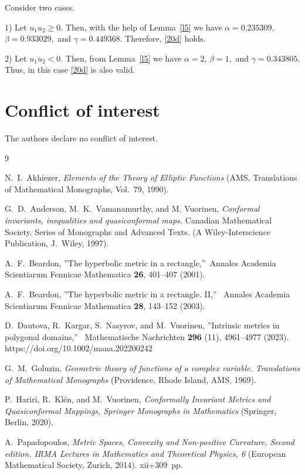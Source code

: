 \documentclass[12pt,a4paper]{amsart}
\begin{document}
Consider two cases.

1) Let
$u_1u_2\ge 0$. Then, with the help of Lemma~\ref{l5} we have $\alpha=0.235309$, $\beta=0.933029,$ and $\gamma=0.449368$. Therefore, \eqref{20d} holds.

2) Let
$u_1u_2<0$. Then, from Lemma~\ref{l5} we have $\alpha=2$, $\beta=1,$ and $\gamma=0.343805$. Thus, in this case \eqref{20d} is also valid.

\section*{Conflict of interest}
The authors declare no conflict of interest.


\begin{thebibliography}{9}

N.~I.~Akhiezer, \emph{Elements of the Theory of Elliptic Functions}
(AMS, Translations of Mathematical Monographs, Vol.~79,
1990).


G.~D.~Anderson, M.~K.~Vamanamurthy, and
M. Vuorinen,  \emph{Conformal invariants, inequalities and
quasiconformal maps.}   Canadian Mathematical Society. Series of Monographs and Advanced Texts. (A Wiley-Interscience Publication, J.~Wiley, 1997).

A.~F.~Beardon, ''The hyperbolic metric in a rectangle,''\  Annales
Academia Scientiarum Fennicae Mathematica \textbf{26}, 401--407 (2001).

A.~F.~Beardon, ''The hyperbolic metric in a rectangle. II,'' \ Annales
Academia Scientiarum Fennicae Mathematica  \textbf{28}, 143--152 (2003).

 D.~Dautova, R.~Kargar, S.~Nasyrov, and M.~Vuorinen, ''Intrinsic metrics in polygonal domains,'' \ Mathematische Nachrichten \textbf{296} (11), 4961--4977 (2023).
https://doi.org/10.1002/mana.202200242

G.~M.~Goluzin, \emph{Geometric theory of functions of a complex variable. Translations of Mathematical Monographs} (Providence, Rhode Island, AMS, 1969).

P.~Hariri, R.~Kl\'en, and M.~Vuorinen, \emph{Conformally Invariant Metrics and Quasiconformal Mappings, Springer Monographs
in Mathematics} (Springer, Berlin, 2020). %

A.~Papadopoulos, \emph{Metric Spaces, Convexity and Non-positive Curvature, Second edition. IRMA Lectures in Mathematics
and Theoretical Physics, 6} (European Mathematical Society, Zurich, 2014). xii+309~pp.


\end{thebibliography}
\end{document}
